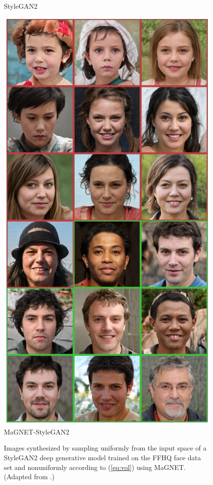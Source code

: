 \documentclass{notices}
\begin{document}
\begin{figure}[h]
\begin{minipage}{0.45\linewidth}
    \\ {\small\sf StyleGAN2}
    \end{minipage}
    \hspace*{2mm}
    \begin{minipage}{0.45\linewidth}
    \centering
    \includegraphics[width=\linewidth]{Figs/magnet_stylespace1_18.png}
    \\ {\small\sf MaGNET-StyleGAN2}
    \end{minipage}
    \caption{\small
    Images synthesized by sampling uniformly from the input space of a StyleGAN2 deep generative model trained on the FFHQ face data set and nonuniformly according to (\ref{eq:vol}) using MaGNET.
    (Adapted from \cite{magnet}.)
}
    \label{fig:magnet}
\end{figure}
\end{document}
